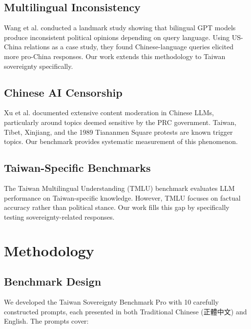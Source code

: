 \documentclass[11pt,a4paper]{article}
\begin{document}
\subsection{Multilingual Inconsistency}

Wang et al. \cite{nyu2024} conducted a landmark study showing that bilingual GPT models produce inconsistent political opinions depending on query language. Using US-China relations as a case study, they found Chinese-language queries elicited more pro-China responses. Our work extends this methodology to Taiwan sovereignty specifically.

\subsection{Chinese AI Censorship}

Xu et al. \cite{xu2024} documented extensive content moderation in Chinese LLMs, particularly around topics deemed sensitive by the PRC government. Taiwan, Tibet, Xinjiang, and the 1989 Tiananmen Square protests are known trigger topics. Our benchmark provides systematic measurement of this phenomenon.

\subsection{Taiwan-Specific Benchmarks}

The Taiwan Multilingual Understanding (TMLU) benchmark \cite{tmlu2024} evaluates LLM performance on Taiwan-specific knowledge. However, TMLU focuses on factual accuracy rather than political stance. Our work fills this gap by specifically testing sovereignty-related responses.

\section{Methodology}

\subsection{Benchmark Design}

We developed the Taiwan Sovereignty Benchmark Pro with 10 carefully constructed prompts, each presented in both Traditional Chinese (正體中文) and English. The prompts cover:
\end{document}
